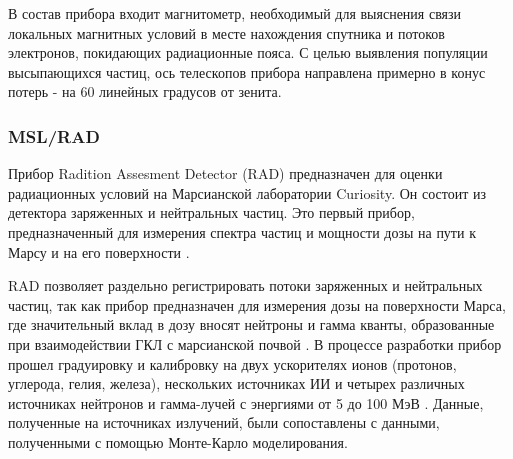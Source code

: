В состав прибора входит магнитометр, необходимый для выяснения связи локальных магнитных условий в месте нахождения спутника и потоков электронов, покидающих радиационные пояса. С целью выявления популяции высыпающихся частиц, ось телескопов прибора направлена примерно в конус потерь - на 60 линейных градусов от зенита.







\subsubsection{MSL/RAD}
Прибор Radition Assesment Detector (RAD) предназначен для оценки радиационных условий на Марсианской лаборатории Curiosity. Он состоит из детектора заряженных и нейтральных частиц\cite{Zeitlin2016}. Это первый прибор, предназначенный для измерения спектра частиц и мощности дозы на пути к Марсу и на его поверхности \cite{Matthia}.

RAD позволяет раздельно регистрировать потоки заряженных и нейтральных частиц, так как прибор предназначен для измерения дозы на поверхности Марса, где значительный вклад в дозу вносят нейтроны и гамма кванты, образованные при взаимодействии ГКЛ с марсианской почвой \cite{Zeitlin2010}. В процессе разработки прибор прошел градуировку и калибровку на двух ускорителях ионов (протонов, углерода, гелия, железа), нескольких источниках ИИ и четырех различных источниках нейтронов и гамма-лучей с энергиями от 5  до 100 МэВ \cite{Zeitlin2010}. Данные, полученные на источниках излучений, были сопоставлены с данными, полученными с помощью Монте-Карло моделирования.



